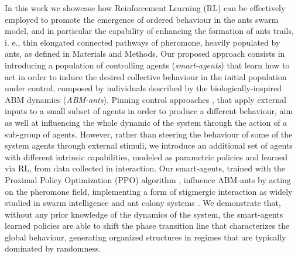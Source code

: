 \documentclass[openacc]{rsproca_new}
\begin{document}
In this work we showcase how Reinforcement Learning (RL) \cite{suttonbarto} can be effectively employed to promote the emergence of ordered behaviour in the ants swarm model, and in particular the capability of enhancing the formation of ants trails, i. e., thin elongated connected pathways of pheromone, heavily populated by ants, as defined in Materials and Methods. %
Our proposed approach consists in introducing a population of controlling agents (\textit{smart-agents}) that learn how to act in order to induce the desired collective behaviour in the initial population under control, composed by individuals described by the biologically-inspired ABM dynamics (\textit{ABM-ants}). Pinning control approaches \cite{controlCS}, that apply external inputs to a small subset of agents in order to produce a different behaviour, aim as well at influencing the whole dynamic of the system through the action of a sub-group of agents. However, rather than steering the behaviour of some of the system agents through external stimuli, we introduce an additional set of agents with different intrinsic capabilities, modeled as parametric policies and learned via RL, from data collected in interaction. 
Our smart-agents, trained with the Proximal Policy Optimization (PPO) algorithm \cite{ppo}, influence ABM-ants by acting on the pheromone field, implementing a form of stigmergic interaction \cite{stigmergy} as widely studied in swarm intelligence and ant colony systems \cite{ACP}. We demonstrate that, without any prior knowledge of the dynamics of the system, the smart-agents learned policies are able to shift the phase transition line that characterizes the global behaviour, generating organized structures in regimes that are typically dominated by randomness. 
\end{document}
